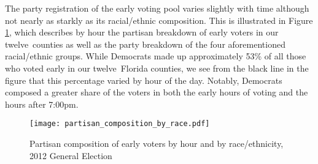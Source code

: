 \documentclass[12pt,titlepage]{article}
\newcommand{\numcounties}{twelve}
\begin{document}




The party registration of the early voting pool varies slightly with
time although not nearly as starkly as its racial/ethnic composition.
This is illustrated in Figure \ref{fig:party2012}, which describes by
hour the partisan breakdown of early voters in our \numcounties\
counties as well as the party breakdown of the four aforementioned
racial/ethnic groups.  While Democrats made up approximately 53\% of
all those who voted early in our \numcounties\ Florida counties, we
see from the black line in the figure that this percentage varied by
hour of the day.  Notably, Democrats composed a greater share of the
voters in both the early hours of voting and the hours after 7:00pm.


\begin{figure}[!ht]
\caption{Partisan composition of early voters by hour and by race/ethnicity, 2012
  General Election}
  \label{fig:party2012}
  \centering
    \centering\texttt{[image: partisan\_composition\_by\_race.pdf]}
\end{figure}


\end{document}

